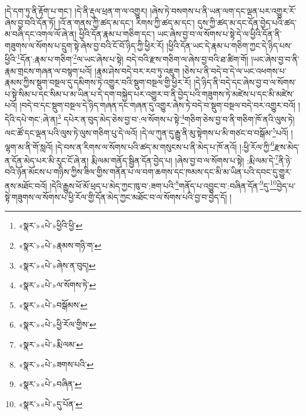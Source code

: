 །དེ་དག་ཏུ་ནི་རྟོག་པ་གང་། །དེ་ནི་རྡུལ་ཕྲན་ག་ལ་འགྱུར། །ཞེས་ཏེ་བསགས་པ་ནི་ཡན་ལག་དང་ལྡན་པར་འགྱུར་རོ་ཞེས་བྱ་བའི་དོན་ཏོ། །འོ་ན་གནས་ཀྱི་ཚད་མ་དང་། རིགས་ཀྱི་ཚད་མ་དང་། དུས་ཀྱི་ཚད་མ་དང་དོན་བྱེད་པའི་ཚད་མ་བཞི་དང་འགལ་ལོ་ཞེ་ན། ཕྱིའི་དོན་རྣམ་པ་གཅིག་དང་། ཡང་ཞེས་བྱ་བ་ལ་སོགས་པ་སྟེ་དེ་ལ་ཕྱིའི་དོན་ནི་གཟུགས་ལ་སོགས་པ་དྲུག་སྟེ་ཞེས་བྱ་བའི་ངོ་བོ་ཉིད་ཀྱི་ཕྱིར་རོ། །ཕྱིའི་དོན་ཡང་དེ་རྣམ་པ་གཅིག་ཀྱང་དེ་ཉིད་པས་ཕྱིའི་\footnote{«སྣར་»«པེ་»ཕྱིའི་ཕྱི་}དོན་:རྣམ་པ་གཅིག་\footnote{«སྣར་»«པེ་»རྣམས་གཉི་ག་}ལ་ཡང་ཞེས་པ་སྟེ། བདེ་བའི་རྫས་གཅིག་ལ་ཞེས་བྱ་བའི་ཐ་ཚིག་གོ། །ཡང་ཞེས་བྱ་བ་ནི་རྣམ་གྲངས་གཞན་ལ་བསྙག་པའོ། །རྣམ་ཤེས་བདེ་བར་རབ་ཏུ་འཇུག །ཅེས་པ་ནི་བདེ་བ་དེ་ལ་ཡང་འཕགས་པ་རྣམས་ཀྱིས་སྡུག་བསྔལ་དུ་དམིགས་ཏེ་འགྱུར་བའི་སྡུག་བསྔལ་གྱི་ཕྱིར་རོ། །དེ་ཉིད་ནི་བདེ་དང་ཞེས་བྱ་བ་ལ་སོགས་པ་སྟེ་སིམ་པ་དང་སིམ་པ་མ་ཡིན་པ་དེ་དག་བསྐྱེད་པར་འགྱུར་བ་ནི་བྱེད་པའི་གཟུགས་ཏེ་མཛེས་པ་དང་མི་མཛེས་པའོ། །བདེ་བ་དང་སྡུག་བསྔལ་དེ་ཉིད་གཞན་དང་གཞན་དུ་འགྱུར་ཞེས་ཏེ་བདེ་བ་སྡུག་བསྔལ་བདེ་བར་འགྱུར་བའོ། །དེའི་དཔེ་གང་:ཞེ་ན།\footnote{«སྣར་»«པེ་»ཞེས་ན་བུད།} དཔེར་ན་བུད་མེད་ཅེས་བྱ་བ་:ལ་སོགས་པ་སྟེ་\footnote{«སྣར་»«པེ་»ལ་སོགས་ཏེ་}གཅིག་ཅེས་བྱ་བ་ནི་གཅིག་ཁོ་ནའི་ལུས་ཏེ། ལང་ཚོ་དང་ལྡན་པའི་ལུས་ཏེ་ལུས་གཅིག་པུ་དེ་ལའོ། །དེ་ལ་ཀུན་དུ་རྒྱུ་ནི་མུ་སྟེགས་པ་མི་གཙང་བ་བསྒོམ་\footnote{«སྣར་»«པེ་»བསྒོམས་}པའོ། །ལྷག་མ་ནི་གོ་སླའོ། །དེ་བས་ན་རིགས་ལ་སོགས་པའི་ཚད་མ་གསུངས་པ་ནི་མེད་པ་ཁོ་ནའོ། །:ཕྱི་རོལ་ཀྱི་\footnote{«སྣར་»«པེ་»ཕྱི་རོལ་གྱིས་}རྫས་མེད་ན་དོན་མེད་པར་མི་རུང་ངོ་ཞེ་ན། རྨི་ལམ་གནོད་སྦྱིན་དོན་བྱེད་པ། །ཞེས་བྱ་བ་ལ་སོགས་པ་སྟེ། :རྨི་ལམ་དེ་\footnote{«སྣར་»«པེ་»རྨི་ལམ་}ནི་ཉེ་བའི་ཉོན་མོངས་པ་གཉིས་ཀྱིས་ཟིལ་གྱིས་གནོན་པ་ལ་བག་ཆགས་དང་ཁམས་དང་མི་མ་ཡིན་པའི་དབང་དུ་གྱུར་ནས་མཐོང་བའོ། །དེའི་རྒྱུས་ཕོ་མོ་ཕྲད་པ་མེད་ཀྱང་ཁུ་བ་:ཟག་པའི་\footnote{«སྣར་»«པེ་»ཟགས་པའི་}གནོད་པ་འབྱུང་བ་:བཞིན་དོན་\footnote{«སྣར་»«པེ་»བཞིན་}དུ་\footnote{«སྣར་»«པེ་»དུ་པོན་}བྱེད་པ་སྟེ་གཟུགས་ལ་སོགས་པ་ཕྱི་རོལ་གྱི་དོན་མེད་ཀྱང་མཐོང་བ་ལ་སོགས་པའི་བྱ་བ་བྱེད་དོ། །
